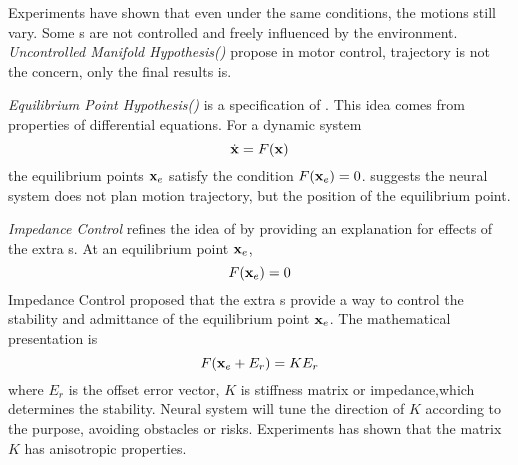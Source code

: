 Experiments have shown that even under the same conditions, the motions still vary. 
Some \dof s are not controlled and freely influenced by the environment. 
\emph{Uncontrolled Manifold Hypothesis(\umh)}\citep{latash2008neurophysiological} propose in motor control, trajectory is not the concern, only the final results is.


\emph{Equilibrium Point Hypothesis(\eph)}\citep{feldman1986ome} is a specification of \umh.
This idea comes from properties of differential equations. 
For a dynamic system
\[
\dot{\mathbf{x}}=F(\mathbf{x})
\]
the equilibrium points $\mathbf{x}_{e}$ satisfy the condition $F(\mathbf{x}_{e})=0$.
\eph suggests the neural system does not plan motion trajectory, but the position of the equilibrium point.



\emph{Impedance Control} \citep{hogan1985ica} refines the idea of \eph by providing an explanation for effects of the extra \dof s. 
At an equilibrium point $\mathbf{x}_{e}$,
\[
F(\mathbf{x}_{e})=0 
\]
Impedance Control proposed that the extra \dof s provide a way to control the stability and admittance of the equilibrium point $\mathbf{x}_{e}$. 
The mathematical presentation is
\begin{equation}
F(\mathbf{x}_{e}+E_r)=KE_r
\end{equation}
where $E_r$ is the offset error vector, $K$ is stiffness matrix or impedance,which determines the stability.
Neural system will tune the direction of $K$ according to the purpose,  avoiding obstacles or risks. 
Experiments \citep{Franklin2007} has shown  that the matrix $K$ has anisotropic properties.







